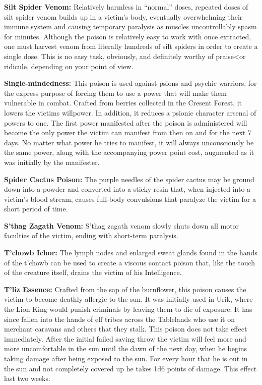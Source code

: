 \textbf{Silt Spider Venom:} Relatively harmless in ``normal'' doses, repeated doses of silt spider venom builds up in a victim's body, eventually overwhelming their immune system and causing temporary paralysis as muscles uncontrollably spasm for minutes. Although the poison is relatively easy to work with once extracted, one must harvest venom from literally hundreds of silt spiders in order to create a single dose. This is no easy task, obviously, and definitely worthy of praise<or ridicule, depending on your point of view.

\textbf{Single-mindedness:} This poison is used against psions and psychic warriors, for the express purpose of forcing them to use a power that will make them vulnerable in combat. Crafted from berries collected in the Cresent Forest, it lowers the victims willpower. In addition, it reduces a psionic character arsenal of powers to one. The first power manifested after the poison is administered will become the only power the victim can manifest from then on and for the next 7 days. No matter what power he tries to manifest, it will always uncousciously be the same power, along with the accompanying power point cost, augmented as it was initially by the manifester.

\textbf{Spider Cactus Poison:} The purple needles of the spider cactus may be ground down into a powder and converted into a sticky resin that, when injected into a victim's blood stream, causes full-body convulsions that paralyze the victim for a short period of time.

\textbf{S'thag Zagath Venom:} S'thag zagath venom slowly shuts down all motor faculties of the victim, ending with short-term paralysis.

\textbf{T'chowb Ichor:} The lymph nodes and enlarged sweat glands found in the hands of the t'chowb can be used to create a viscous contact poison that, like the touch of the creature itself, drains the victim of his Intelligence.

\textbf{T'liz Essence:} Crafted from the sap of the burnflower, this poison causes the victim to become deathly allergic to the sun. It was initially used in Urik, where the Lion King would punish criminals by leaving them to die of exposure. It has since fallen into the hands of elf tribes across the Tablelands who use it on merchant caravans and others that they stalk. This poison does not take effect immediately. After the initial failed saving throw the victim will feel more and more uncomfortable in the sun until the dawn of the next day, when he begins taking damage after being exposed to the sun. For every hour that he is out in the sun and not completely covered up he takes 1d6 points of damage. This effect last two weeks.

